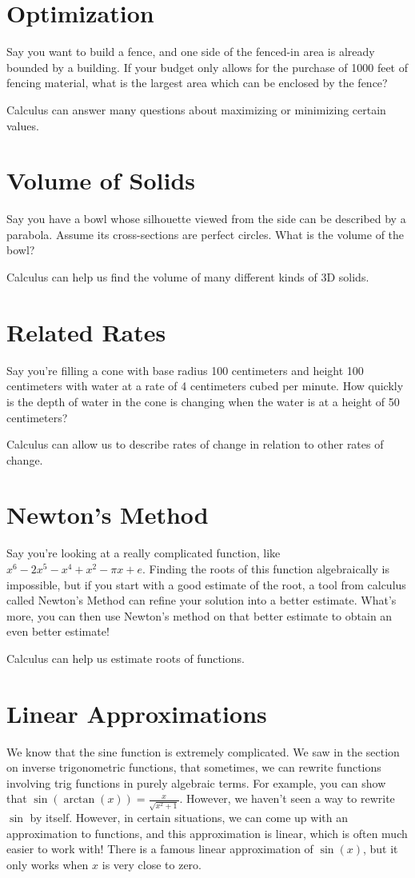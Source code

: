 \documentclass{ximera}
\begin{document}
\section{Optimization}
Say you want to build a fence, and one side of the fenced-in area is already bounded by a building. If your budget only allows for the purchase of 1000 feet of fencing material, what is the largest area which can be enclosed by the fence?

Calculus can answer many questions about maximizing or minimizing certain values. 

\section{Volume of Solids}
Say you have a bowl whose silhouette viewed from the side can be described by a parabola. Assume its cross-sections are perfect circles. What is the volume of the bowl? 

Calculus can help us find the volume of many different kinds of 3D solids. 

\section{Related Rates}
Say you're filling a cone with base radius 100 centimeters and height 100 centimeters with water at a rate of 4 centimeters cubed per minute. How quickly is the depth of water in the cone is changing when the water is at a height of 50 centimeters? 

Calculus can allow us to describe rates of change in relation to other rates of change. 

\section{Newton's Method}
Say you're looking at a really complicated function, like $x^6 - 2x^5 - x^4 + x^2 - \pi x + e$. Finding the roots of this function algebraically is impossible, but if you start with a good estimate of the root, a tool from calculus called Newton's Method can refine your solution into a better estimate. What's more, you can then use Newton's method on that better estimate to obtain an even better estimate!

Calculus can help us estimate roots of functions. 

\section{Linear Approximations}
We know that the sine function is extremely complicated. We saw in the section on inverse trigonometric functions, that sometimes, we can rewrite functions involving trig functions in purely algebraic terms. For example, you can show that $\sin(\arctan(x)) = \frac{x}{\sqrt{x^2 + 1}}$. However, we haven't seen a way to rewrite $\sin$ by itself. However, in certain situations, we can come up with an approximation to functions, and this approximation is linear, which is often much easier to work with! There is a famous linear approximation of $\sin(x)$, but it only works when $x$ is very close to zero.
\end{document}
